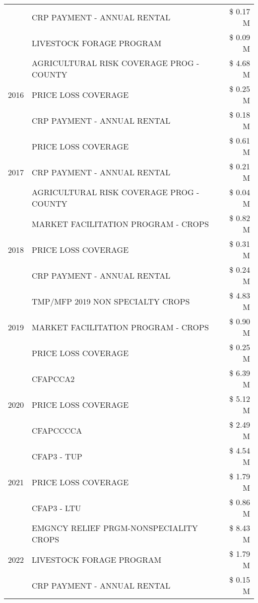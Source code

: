 \begin{tabular}{llr}
 & CRP PAYMENT - ANNUAL RENTAL & \$ 0.17 M \\
 & LIVESTOCK FORAGE PROGRAM & \$ 0.09 M \\
\cline{1-3}
\multirow[t]{3}{*}{2016} & AGRICULTURAL RISK COVERAGE PROG - COUNTY & \$ 4.68 M \\
 & PRICE LOSS COVERAGE & \$ 0.25 M \\
 & CRP PAYMENT - ANNUAL RENTAL & \$ 0.18 M \\
\cline{1-3}
\multirow[t]{3}{*}{2017} & PRICE LOSS COVERAGE & \$ 0.61 M \\
 & CRP PAYMENT - ANNUAL RENTAL & \$ 0.21 M \\
 & AGRICULTURAL RISK COVERAGE PROG - COUNTY & \$ 0.04 M \\
\cline{1-3}
\multirow[t]{3}{*}{2018} & MARKET FACILITATION PROGRAM - CROPS & \$ 0.82 M \\
 & PRICE LOSS COVERAGE & \$ 0.31 M \\
 & CRP PAYMENT - ANNUAL RENTAL & \$ 0.24 M \\
\cline{1-3}
\multirow[t]{3}{*}{2019} & TMP/MFP 2019 NON SPECIALTY CROPS & \$ 4.83 M \\
 & MARKET FACILITATION PROGRAM - CROPS & \$ 0.90 M \\
 & PRICE LOSS COVERAGE & \$ 0.25 M \\
\cline{1-3}
\multirow[t]{3}{*}{2020} & CFAPCCA2 & \$ 6.39 M \\
 & PRICE LOSS COVERAGE & \$ 5.12 M \\
 & CFAPCCCCA & \$ 2.49 M \\
\cline{1-3}
\multirow[t]{3}{*}{2021} & CFAP3 - TUP & \$ 4.54 M \\
 & PRICE LOSS COVERAGE & \$ 1.79 M \\
 & CFAP3 - LTU & \$ 0.86 M \\
\cline{1-3}
\multirow[t]{3}{*}{2022} & EMGNCY RELIEF PRGM-NONSPECIALITY CROPS & \$ 8.43 M \\
 & LIVESTOCK FORAGE PROGRAM & \$ 1.79 M \\
 & CRP PAYMENT - ANNUAL RENTAL & \$ 0.15 M \\
\cline{1-3}
\bottomrule
\end{tabular}
